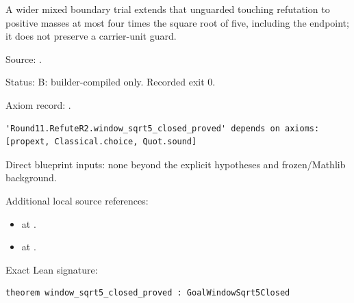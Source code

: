 \begin{theorem}[bp-236]
\label{bp-236}
\uses{}
\leanok
A wider mixed boundary trial extends that unguarded touching refutation to positive masses at most four times the square root of five, including the endpoint; it does not preserve a carrier-unit guard.

\par Source: \texttt{}.
\par Status: B: builder-compiled only. Recorded exit 0.
\par Axiom record: \texttt{}.
\begin{verbatim}
'Round11.RefuteR2.window_sqrt5_closed_proved' depends on axioms: [propext, Classical.choice, Quot.sound]
\end{verbatim}
\par Direct blueprint inputs: none beyond the explicit hypotheses and frozen/Mathlib background.
\par Additional local source references:
\begin{itemize}
\item \texttt{} at \texttt{}.
\item \texttt{} at \texttt{}.
\end{itemize}
\par Exact Lean signature:
\begin{verbatim}
theorem window_sqrt5_closed_proved : GoalWindowSqrt5Closed
\end{verbatim}
\end{theorem}

